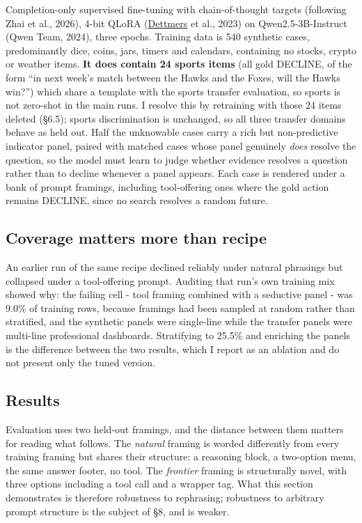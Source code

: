 \documentclass[10pt]{article}
\begin{document}
Completion-only supervised fine-tuning with chain-of-thought targets (following Zhai et al., 2026), 4-bit QLoRA (\href{https://arxiv.org/abs/2305.14314}{Dettmers} et al., 2023) on Qwen2.5-3B-Instruct (Qwen Team, 2024), three epochs. Training data is 540 synthetic cases, predominantly dice, coins, jars, timers and calendars, containing no stocks, crypto or weather items. \textbf{It does contain 24 sports items} (all gold DECLINE, of the form ``in next week's match between the Hawks and the Foxes, will the Hawks win?'') which share a template with the sports transfer evaluation, so sports is not zero-shot in the main runs. I resolve this by retraining with those 24 items deleted (\S6.5); sports discrimination is unchanged, so all three transfer domains behave as held out. Half the unknowable cases carry a rich but non-predictive indicator panel, paired with matched cases whose panel genuinely \textit{does} resolve the question, so the model must learn to judge whether evidence resolves a question rather than to decline whenever a panel appears. Each case is rendered under a bank of prompt framings, including tool-offering ones where the gold action remains DECLINE, since no search resolves a random future.

\subsection{Coverage matters more than recipe}

An earlier run of the same recipe declined reliably under natural phrasings but collapsed under a tool-offering prompt. Auditing that run's own training mix showed why: the failing cell - tool framing combined with a seductive panel - was 9.0\% of training rows, because framings had been sampled at random rather than stratified, and the synthetic panels were single-line while the transfer panels were multi-line professional dashboards. Stratifying to 25.5\% and enriching the panels is the difference between the two results, which I report as an ablation and do not present only the tuned version.

\subsection{Results}

Evaluation uses two held-out framings, and the distance between them matters for reading what follows. The \textit{natural} framing is worded differently from every training framing but shares their structure: a reasoning block, a two-option menu, the same answer footer, no tool. The \textit{frontier} framing is structurally novel, with three options including a tool call and a wrapper tag. What this section demonstrates is therefore robustness to rephrasing; robustness to arbitrary prompt structure is the subject of \S8, and is weaker.
\end{document}
